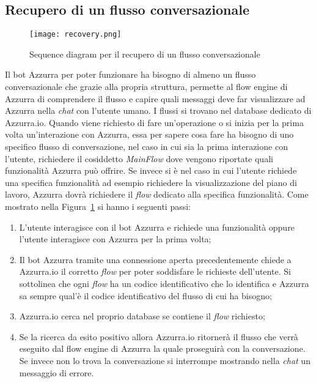 \subsection{Recupero di un flusso conversazionale}
\begin{figure}[h]
	\begin{center}
		\texttt{[image: recovery.png]}
		\caption{Sequence diagram per il recupero di un flusso conversazionale}\label{fig:recovery}
	\end{center}
\end{figure}
Il \gls{bot}\ap{[g]} Azzurra per poter funzionare ha bisogno di almeno un flusso conversazionale che grazie alla propria struttura, permette al flow engine di Azzurra di comprendere il flusso e capire quali messaggi deve far visualizzare ad Azzurra nella \emph{chat} con l'utente umano. I flussi si trovano nel database dedicato di Azzurra.io. Quando viene richiesto di fare un’operazione o si inizia per la prima volta un'interazione con Azzurra, essa per sapere cosa fare ha bisogno di uno specifico flusso di conversazione, nel caso in cui sia la prima interazione con l'utente, richiedere il cosiddetto \emph{MainFlow} dove vengono riportate quali funzionalità Azzurra può offrire. Se invece si è nel caso in cui l'utente richiede una specifica funzionalità ad esempio richiedere la visualizzazione del piano di lavoro, Azzurra dovrà richiedere il \emph{flow} dedicato alla specifica funzionalità.
Come mostrato nella Figura~\ref{fig:recovery} si hanno i seguenti passi:
\begin{enumerate}
\item L'utente interagisce con il \gls{bot}\ap{[g]} Azzurra e richiede una funzionalità oppure l'utente interagisce con Azzurra per la prima volta;
\item Il \gls{bot}\ap{[g]} Azzurra tramite una connessione aperta precedentemente chiede a Azzurra.io il corretto \emph{flow} per poter soddisfare le richieste dell'utente. Si sottolinea che ogni \emph{flow} ha un codice identificativo che lo identifica e Azzurra sa sempre qual'è il codice identificativo del flusso di cui ha bisogno;
\item Azzurra.io cerca nel proprio database se contiene il \emph{flow} richiesto;
\item Se la ricerca da esito positivo allora Azzurra.io ritornerà il flusso che verrà eseguito dal flow engine di Azzurra la quale proseguirà con la conversazione. Se invece non lo trova la conversazione si interrompe mostrando nella \emph{chat} un messaggio di errore.
\end{enumerate}

